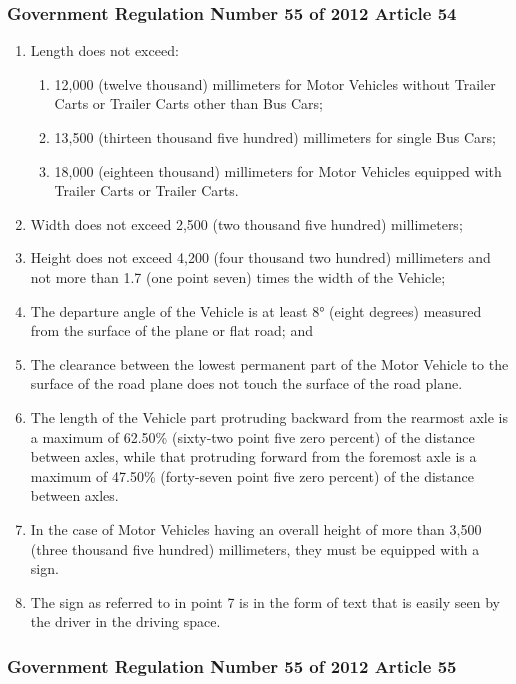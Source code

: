 \subsubsection{Government Regulation Number 55 of 2012 Article 54}

\begin{enumerate}[noitemsep]
  \item Length does not exceed:
  \begin{enumerate}[noitemsep]
    \item 12,000 (twelve thousand) millimeters for Motor Vehicles without Trailer Carts or Trailer Carts other than Bus Cars;
    \item 13,500 (thirteen thousand five hundred) millimeters for single Bus Cars;
    \item 18,000 (eighteen thousand) millimeters for Motor Vehicles equipped with Trailer Carts or Trailer Carts.
  \end{enumerate}
  \item Width does not exceed 2,500 (two thousand five hundred) millimeters;
  \item Height does not exceed 4,200 (four thousand two hundred) millimeters and not more than 1.7 (one point seven) times the width of the Vehicle;
  \item The departure angle of the Vehicle is at least 8° (eight degrees) measured from the surface of the plane or flat road; and
  \item The clearance between the lowest permanent part of the Motor Vehicle to the surface of the road plane does not touch the surface of the road plane.
  \item The length of the Vehicle part protruding backward from the rearmost axle is a maximum of 62.50\% (sixty-two point five zero percent) of the distance between axles, while that protruding forward from the foremost axle is a maximum of 47.50\% (forty-seven point five zero percent) of the distance between axles.
  \item In the case of Motor Vehicles having an overall height of more than 3,500 (three thousand five hundred) millimeters, they must be equipped with a sign.
  \item The sign as referred to in point 7 is in the form of text that is easily seen by the driver in the driving space.
\end{enumerate}

\subsubsection{Government Regulation Number 55 of 2012 Article 55}

